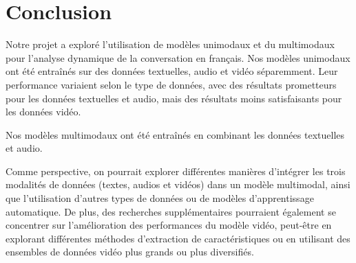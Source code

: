 \documentclass[a4paper]{article}
\begin{document}

\section{Conclusion}

Notre projet a exploré l'utilisation de modèles unimodaux et du multimodaux pour l'analyse dynamique de la conversation en français.
Nos modèles unimodaux ont été entraînés sur des données textuelles, audio et vidéo séparemment. Leur performance variaient selon le type de données, avec des résultats prometteurs pour les données textuelles et audio, mais des résultats moins satisfaisants pour les données vidéo.

Nos modèles multimodaux ont été entraînés en combinant les données textuelles et audio. 


Comme perspective, on pourrait explorer différentes manières d'intégrer les trois modalités de données (textes, audios et vidéos) dans un modèle multimodal, 
ainsi que l'utilisation d'autres types de données ou de modèles d'apprentissage automatique. 
De plus, des recherches supplémentaires pourraient également se concentrer sur l'amélioration des performances du modèle vidéo, 
peut-être en explorant différentes méthodes d'extraction de caractéristiques ou en utilisant des ensembles de données vidéo plus grands ou plus diversifiés.

\bigskip
\printbibliography
\end{document}
